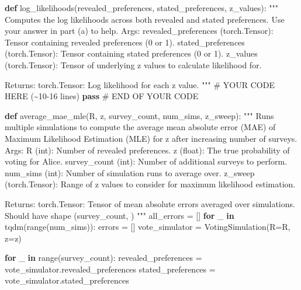 \documentclass[
  letterpaper,
  DIV=11,
  numbers=noendperiod,
  oneside]{scrreprt}
\newenvironment{Shaded}{\begin{snugshade}}{\end{snugshade}}
\newcommand{\BuiltInTok}[1]{\textcolor[rgb]{0.00,0.23,0.31}{#1}}
\newcommand{\CommentTok}[1]{\textcolor[rgb]{0.37,0.37,0.37}{#1}}
\newcommand{\ControlFlowTok}[1]{\textcolor[rgb]{0.00,0.23,0.31}{\textbf{#1}}}
\newcommand{\KeywordTok}[1]{\textcolor[rgb]{0.00,0.23,0.31}{\textbf{#1}}}
\newcommand{\NormalTok}[1]{\textcolor[rgb]{0.00,0.23,0.31}{#1}}
\newcommand{\OperatorTok}[1]{\textcolor[rgb]{0.37,0.37,0.37}{#1}}
\newcommand{\RegionMarkerTok}[1]{\textcolor[rgb]{0.00,0.23,0.31}{#1}}
\theoremstyle{remark}
\begin{document}
\begin{Shaded}
\begin{Highlighting}[]
\KeywordTok{def}\NormalTok{ log\_likelihoods(revealed\_preferences, stated\_preferences, z\_values):}
    \CommentTok{"""}
\CommentTok{    Computes the log likelihoods across both revealed and stated preferences.}
\CommentTok{    Use your answer in part (a) to help.}
\CommentTok{    }
\CommentTok{    Args:}
\CommentTok{        revealed\_preferences (torch.Tensor): Tensor containing revealed preferences (0 or 1).}
\CommentTok{        stated\_preferences (torch.Tensor): Tensor containing stated preferences (0 or 1).}
\CommentTok{        z\_values (torch.Tensor): Tensor of underlying z values to calculate likelihood for.}

\CommentTok{    Returns:}
\CommentTok{        torch.Tensor: Log likelihood for each z value.}
\CommentTok{    """}
    \CommentTok{\# YOUR CODE HERE (\textasciitilde{}10{-}16 lines)}
    \ControlFlowTok{pass}
    \CommentTok{\# }\RegionMarkerTok{END}\CommentTok{ OF YOUR CODE }

\KeywordTok{def}\NormalTok{ average\_mae\_mle(R, z, survey\_count, num\_sims, z\_sweep):}
    \CommentTok{"""}
\CommentTok{    Runs multiple simulations to compute the average mean absolute error (MAE) of Maximum Likelihood Estimation (MLE) }
\CommentTok{    for z after increasing number of surveys.}
\CommentTok{    }
\CommentTok{    Args:}
\CommentTok{        R (int): Number of revealed preferences.}
\CommentTok{        z (float): The true probability of voting for Alice.}
\CommentTok{        survey\_count (int): Number of additional surveys to perform.}
\CommentTok{        num\_sims (int): Number of simulation runs to average over.}
\CommentTok{        z\_sweep (torch.Tensor): Range of z values to consider for maximum likelihood estimation.}

\CommentTok{    Returns:}
\CommentTok{        torch.Tensor: Tensor of mean absolute errors averaged over simulations.}
\CommentTok{                      Should have shape (survey\_count, )}
\CommentTok{    """}
\NormalTok{    all\_errors }\OperatorTok{=}\NormalTok{ []}
    \ControlFlowTok{for}\NormalTok{ \_ }\KeywordTok{in}\NormalTok{ tqdm(}\BuiltInTok{range}\NormalTok{(num\_sims)):}
\NormalTok{        errors }\OperatorTok{=}\NormalTok{ []}
\NormalTok{        vote\_simulator }\OperatorTok{=}\NormalTok{ VotingSimulation(R}\OperatorTok{=}\NormalTok{R, z}\OperatorTok{=}\NormalTok{z)}

        \ControlFlowTok{for}\NormalTok{ \_ }\KeywordTok{in} \BuiltInTok{range}\NormalTok{(survey\_count):}
\NormalTok{            revealed\_preferences }\OperatorTok{=}\NormalTok{ vote\_simulator.revealed\_preferences}
\NormalTok{            stated\_preferences }\OperatorTok{=}\NormalTok{ vote\_simulator.stated\_preferences}


\end{Highlighting}
\end{Shaded}
\end{document}
